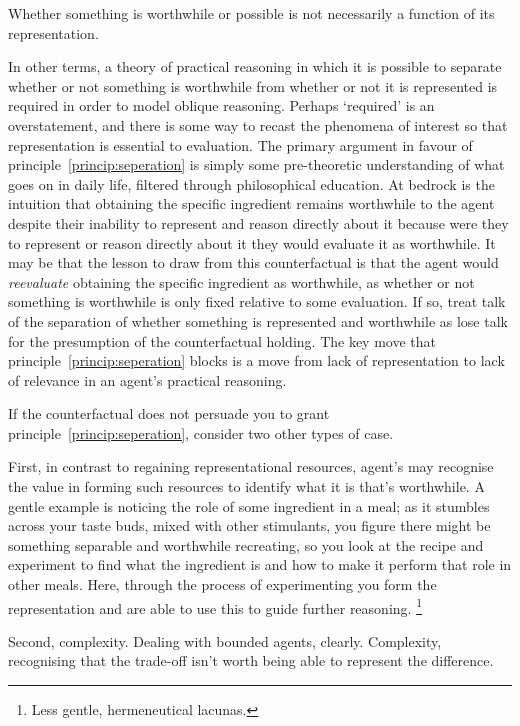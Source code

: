 \documentclass[10pt]{article}
\begin{document}
\begin{principle}\label{princip:seperation}
  Whether something is worthwhile or possible is not necessarily a function of its representation.
\end{principle}
In other terms, a theory of practical reasoning in which it is possible to separate whether or not something is worthwhile from whether or not it is represented is required in order to model {\color{blue} oblique reasoning}.
Perhaps `required' is an overstatement, and there is some way to recast the phenomena of interest so that representation is essential to evaluation.
The primary argument in favour of principle~\ref{princip:seperation} is simply some pre-theoretic understanding of what goes on in daily life, filtered through philosophical education.
At bedrock is the intuition that obtaining the specific ingredient remains worthwhile to the agent despite their inability to represent and reason directly about it because were they to represent or reason directly about it they would evaluate it as worthwhile.
It may be that the lesson to draw from this counterfactual is that the agent would \emph{reevaluate} obtaining the specific ingredient as worthwhile, as whether or not something is worthwhile is only fixed relative to some evaluation.
If so, treat talk of the separation of whether something is represented and worthwhile as lose talk for the presumption of the counterfactual holding.
The key move that principle~\ref{princip:seperation} blocks is a move from lack of representation to lack of relevance in an agent's practical reasoning.

If the counterfactual does not persuade you to grant principle~\ref{princip:seperation}, consider two other types of case.

First, in contrast to regaining representational resources, agent's may recognise the value in forming such resources to identify what it is that's worthwhile.
A gentle example is noticing the role of some ingredient in a meal; as it stumbles across your taste buds, mixed with other stimulants, you figure there might be something separable and worthwhile recreating, so you look at the recipe and experiment to find what the ingredient is and how to make it perform that role in other meals.
Here, through the process of experimenting you form the representation and are able to use this to guide further reasoning.\nolinebreak
\footnote{Less gentle, hermeneutical lacunas.}

Second, complexity.
Dealing with bounded agents, clearly.
Complexity, recognising that the trade-off isn't worth being able to represent the difference.
\end{document}
